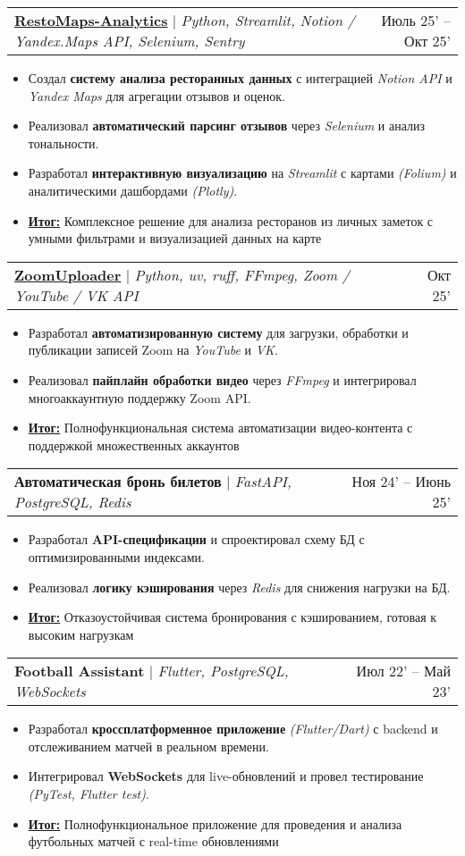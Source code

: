 \documentclass[letterpaper,11pt]{article}
\makeatletter
\newcommand{\resumeItem}[1]{
  \item\small{
    {#1 \vspace{-2pt}}
  }
}
\newcommand{\resumeProjectHeading}[2]{
    \item
    \begin{tabular*}{0.97\textwidth}{l@{\extracolsep{\fill}}r}
      \small#1 & #2 \\
    \end{tabular*}\vspace{-7pt}
}
\newcommand{\resumeItemListStart}{\begin{itemize}}
\newcommand{\resumeItemListEnd}{\end{itemize}\vspace{-5pt}}
\makeatother
\begin{document}
    \resumeProjectHeading
    {\href{https://github.com/GordeyZuev/RestoMaps-Analytics}{\textcolor{blue!50!black}{\textbf{RestoMaps-Analytics}}} $|$ \emph{Python, Streamlit, Notion / Yandex.Maps API, Selenium, Sentry}}{Июль 25' -- Окт 25'}
    \resumeItemListStart
        \resumeItem{Создал \textbf{систему анализа ресторанных данных} с интеграцией \textit{Notion API} и \textit{Yandex Maps} для агрегации отзывов и оценок.}
        \resumeItem{Реализовал \textbf{автоматический парсинг отзывов} через \textit{Selenium} и анализ тональности.}
        \resumeItem{Разработал \textbf{интерактивную визуализацию} на \textit{Streamlit} с картами \textit{(Folium)} и аналитическими дашбордами \textit{(Plotly)}.}
        \resumeItem{\underline{\textbf{Итог:}} Комплексное решение для анализа ресторанов из личных заметок с умными фильтрами и визуализацией данных на карте}
    \resumeItemListEnd

    \resumeProjectHeading
    {\href{https://github.com/GordeyZuev/ZoomUploader}{\textcolor{blue!50!black}{\textbf{ZoomUploader}}} $|$ \emph{Python, uv, ruff, FFmpeg, Zoom / YouTube / VK API}}{Окт 25'}
    \resumeItemListStart
        \resumeItem{Разработал \textbf{автоматизированную систему} для загрузки, обработки и публикации записей Zoom на \textit{YouTube} и \textit{VK}.}
        \resumeItem{Реализовал \textbf{пайплайн обработки видео} через \textit{FFmpeg} и интегрировал многоаккаунтную поддержку Zoom API.}
        \resumeItem{\underline{\textbf{Итог:}} Полнофункциональная система автоматизации видео-контента с поддержкой множественных аккаунтов}
    \resumeItemListEnd

    \resumeProjectHeading
    {\textbf{Автоматическая бронь билетов} $|$ \emph{FastAPI, PostgreSQL, Redis}}{Ноя 24' -- Июнь 25'}
    \resumeItemListStart
        \resumeItem{Разработал \textbf{API-спецификации} и спроектировал схему БД с оптимизированными индексами.}
        \resumeItem{Реализовал \textbf{логику кэширования} через \textit{Redis} для снижения нагрузки на БД.}
        \resumeItem{\underline{\textbf{Итог:}} Отказоустойчивая система бронирования с кэшированием, готовая к высоким нагрузкам}
    \resumeItemListEnd

    \resumeProjectHeading
    {\textbf{Football Assistant} $|$ \emph{Flutter, PostgreSQL, WebSockets}}{Июл 22' -- Май 23'}
    \resumeItemListStart
        \resumeItem{Разработал \textbf{кроссплатформенное приложение} \textit{(Flutter/Dart)} с backend и отслеживанием матчей в реальном времени.}
        \resumeItem{Интегрировал \textbf{WebSockets} для live-обновлений и провел тестирование \textit{(PyTest, Flutter test)}.}
        \resumeItem{\underline{\textbf{Итог:}} Полнофункциональное приложение для проведения и анализа футбольных матчей с real-time обновлениями}
    \resumeItemListEnd
\end{document}
